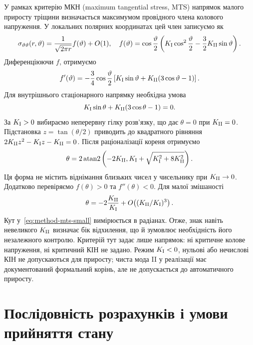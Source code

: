 У рамках критерію МКН (maximum tangential stress, MTS) напрямок малого приросту тріщини визначається максимумом провідного члена колового напруження. У локальних полярних координатах цей член записуємо як
\begin{equation}
 \sigma_{\vartheta\vartheta}(r,\vartheta)
 =\frac{1}{\sqrt{2\pi r}}f(\vartheta)+O(1),\quad
 f(\vartheta)=\cos\frac{\vartheta}{2}
 \left(K_{\mathrm{I}}\cos^2\frac{\vartheta}{2}
       -\frac32K_{\mathrm{II}}\sin\vartheta\right).
 \label{eq:method-hoop}
\end{equation}
Диференціюючи $f$, отримуємо
\begin{equation}
 f'(\vartheta)=-\frac34\cos\frac{\vartheta}{2}
 \left[K_{\mathrm{I}}\sin\vartheta+K_{\mathrm{II}}(3\cos\vartheta-1)\right].
 \label{eq:method-hoop-derivative}
\end{equation}
Для внутрішнього стаціонарного напрямку необхідна умова
\begin{equation}
 K_{\mathrm{I}}\sin\theta+K_{\mathrm{II}}(3\cos\theta-1)=0.
 \label{eq:method-mts-stationarity}
\end{equation}
За $K_{\mathrm{I}}>0$ вибираємо неперервну гілку розв'язку, що дає $\theta=0$ при $K_{\mathrm{II}}=0$. Підстановка $z=\tan(\theta/2)$ приводить до квадратного рівняння $2K_{\mathrm{II}} z^2-K_{\mathrm{I}} z-K_{\mathrm{II}}=0$. Після раціоналізації кореня отримуємо
\begin{equation}
 \theta=2\operatorname{atan2}
 \left(-2K_{\mathrm{II}},K_{\mathrm{I}}+\sqrt{K_{\mathrm{I}}^2+8K_{\mathrm{II}}^2}\right).
 \label{eq:method-mts}
\end{equation}
Ця форма не містить віднімання близьких чисел у чисельнику при $K_{\mathrm{II}}\to0$. Додатково перевіряємо $f(\theta)>0$ та $f''(\theta)<0$. Для малої змішаності
\begin{equation}
 \theta=-2\frac{K_{\mathrm{II}}}{K_{\mathrm{I}}}
 +O\!\left((K_{\mathrm{II}}/K_{\mathrm{I}})^3\right).
 \label{eq:method-mts-small}
\end{equation}
Кут у~\eqref{eq:method-mts-small} вимірюється в радіанах. Отже, знак навіть невеликого $K_{\mathrm{II}}$ визначає бік відхилення, що й зумовлює необхідність його незалежного контролю. Критерій тут задає лише напрямок: ні критичне колове напруження, ні критичний КІН не задано. Режим $K_{\mathrm{I}}<0$, нульові або нечислові КІН не допускаються для приросту; чиста мода II у реалізації має документований формальний корінь, але не допускається до автоматичного приросту.

\section{Послідовність розрахунків і умови прийняття стану}
\label{sec:methods-algorithm}

